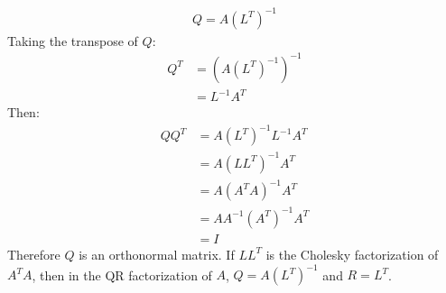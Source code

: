 \documentclass{article}
\begin{document}
\clearpage
\problem{}
\begin{align*}
    Q = A{(L^T)}^{-1}
\end{align*}
\subproblem{}
Taking the transpose of $Q$:
\begin{align*}
    Q^T & = {(A{(L^T)}^{-1})}^{-1} \\
    & = L^{-1} A^T
\end{align*}
Then:
\begin{align*}
    QQ^T & = A{(L^T)}^{-1}L^{-1} A^T \\
    &  = A{(LL^T)}^{-1}A^T \\
    &  = A{(A^T A)}^{-1}A^T \\
    &  = AA^{-1}{(A^T)}^{-1}A^T \\
    & = I
\end{align*}
Therefore $Q$ is an orthonormal matrix.
\subproblem{}
If $LL^T$ is the Cholesky factorization of $A^T A$, then in the QR factorization of $A$, $Q = A(L^T)^{-1}$ and $R = L^T$.
\end{document}
